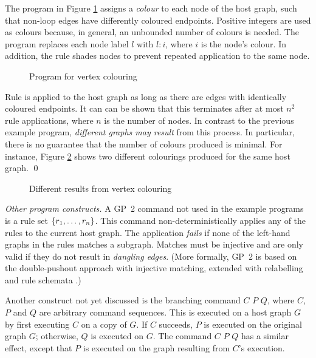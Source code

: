 \begin{example}
The program in Figure \ref{fig:vertex-colouring} assigns a \emph{colour}\/ to each node of the host graph, such that non-loop edges have differently coloured endpoints. Positive integers are used as colours because, in general, an unbounded number of colours is needed. The program replaces each node label $l$\/ with $l{:}i$, where $i$\/ is the node's colour. In addition, the rule  shades nodes to prevent repeated application to the same node.

\begin{figure}[htb]
\begin{center}
 
\end{center}
\caption{Program for vertex colouring}\label{fig:vertex-colouring}
\end{figure}

Rule  is applied to the host graph as long as there are edges with identically coloured endpoints. It can can be shown that this terminates after at most $n^2$ rule applications, where $n$\/ is the number of nodes. In contrast to the previous example program, \emph{different graphs may result}\/ from this process. In particular, there is no guarantee that the number of colours produced is minimal. For instance, Figure \ref{fig:colour_results} shows two different colourings produced for the same host graph.
\qed
\end{example}

\begin{figure}[htb]
\begin{center}
 
\end{center}
\caption{Different results from vertex colouring}\label{fig:colour_results}
\end{figure}

\vspace{.5\baselineskip}
\noindent
\emph{Other program constructs.}
A GP~2 command not used in the example programs is a rule set $\mathtt{\{}r_1,\dots,r_n\mathtt{\}}$. This command non-deterministically applies any of the rules to the current host graph. The application \emph{fails}\/ if none of the left-hand graphs in the rules matches a subgraph. Matches must be injective and are only valid if they do not result in \emph{dangling edges}. (More formally, GP~2 is based on the double-pushout approach with injective matching, extended with relabelling and rule schemata \cite{Plump12a}.)

Another construct not yet discussed is the branching command  $C$  $P$  $Q$, where $C$, $P$ and $Q$ are arbitrary command sequences. This is executed on a host graph $G$ by first executing $C$ on a copy of $G$. If $C$ succeeds, $P$\/ is executed on the original graph $G$; otherwise, $Q$ is executed on $G$. The command  $C$  $P$  $Q$ has a similar effect, except that $P$\/ is executed on the graph resulting from $C$'s execution. 
